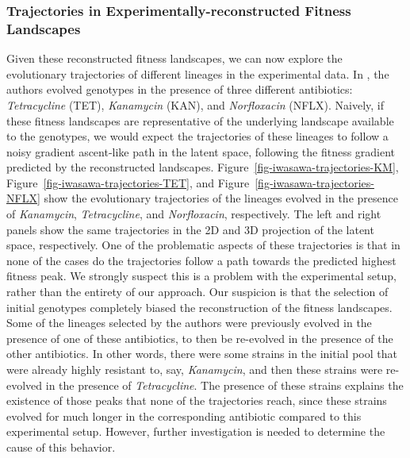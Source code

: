\documentclass[
]{scrartcl}
\begin{document}
\begin{refsection}
\begin{figure}
\end{figure}%

\subsubsection{Trajectories in Experimentally-reconstructed Fitness
Landscapes}\label{trajectories-in-experimentally-reconstructed-fitness-landscapes}

Given these reconstructed fitness landscapes, we can now explore the
evolutionary trajectories of different lineages in the experimental
data. In \autocite{iwasawa2022}, the authors evolved genotypes in the
presence of three different antibiotics: \emph{Tetracycline} (TET),
\emph{Kanamycin} (KAN), and \emph{Norfloxacin} (NFLX). Naively, if these
fitness landscapes are representative of the underlying landscape
available to the genotypes, we would expect the trajectories of these
lineages to follow a noisy gradient ascent-like path in the latent
space, following the fitness gradient predicted by the reconstructed
landscapes. Figure~\ref{fig-iwasawa-trajectories-KM},
Figure~\ref{fig-iwasawa-trajectories-TET}, and
Figure~\ref{fig-iwasawa-trajectories-NFLX} show the evolutionary
trajectories of the lineages evolved in the presence of
\emph{Kanamycin}, \emph{Tetracycline}, and \emph{Norfloxacin},
respectively. The left and right panels show the same trajectories in
the 2D and 3D projection of the latent space, respectively. One of the
problematic aspects of these trajectories is that in none of the cases
do the trajectories follow a path towards the predicted highest fitness
peak. We strongly suspect this is a problem with the experimental setup,
rather than the entirety of our approach. Our suspicion is that the
selection of initial genotypes completely biased the reconstruction of
the fitness landscapes. Some of the lineages selected by the authors
were previously evolved in the presence of one of these antibiotics, to
then be re-evolved in the presence of the other antibiotics. In other
words, there were some strains in the initial pool that were already
highly resistant to, say, \emph{Kanamycin}, and then these strains were
re-evolved in the presence of \emph{Tetracycline}. The presence of these
strains explains the existence of those peaks that none of the
trajectories reach, since these strains evolved for much longer in the
corresponding antibiotic compared to this experimental setup. However,
further investigation is needed to determine the cause of this behavior.

\begin{figure}


\end{figure}
\end{refsection}
\end{document}
